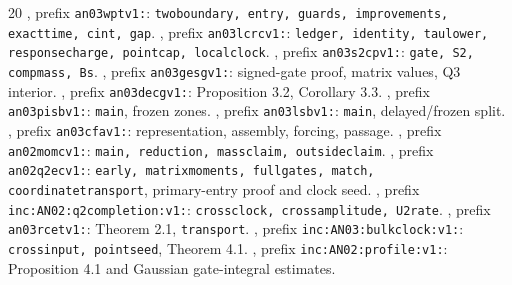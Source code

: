\documentclass[11pt]{article}
\numberwithin{equation}{section}
\theoremstyle{remark}\newtheorem{remark}[theorem]{Remark}
\begin{document}
\begin{thebibliography}{20}\small
{} ,
prefix \texttt{an03wptv1:}: \texttt{twoboundary, entry, guards,
improvements, exacttime, cint, gap}.
 ,
prefix \texttt{an03lcrcv1:}: \texttt{ledger, identity, taulower,
responsecharge, pointcap, localclock}.
 ,
prefix \texttt{an03s2cpv1:}: \texttt{gate, S2, compmass, Bs}.
 ,
prefix \texttt{an03gesgv1:}: signed-gate proof, matrix values,
Q3 interior.
 ,
prefix \texttt{an03decgv1:}: Proposition 3.2, Corollary 3.3.
 ,
prefix \texttt{an03pisbv1:}: \texttt{main}, frozen zones.
 ,
prefix \texttt{an03lsbv1:}: \texttt{main}, delayed/frozen split.
 ,
prefix \texttt{an03cfav1:}: representation, assembly, forcing, passage.
 ,
prefix \texttt{an02momcv1:}: \texttt{main, reduction, massclaim,
outsideclaim}.
 ,
prefix \texttt{an02q2ecv1:}: \texttt{early, matrixmoments, fullgates,
match, coordinatetransport}, primary-entry proof and clock seed.
 ,
prefix \texttt{inc:AN02:q2completion:v1:}: \texttt{crossclock,
crossamplitude, U2rate}.
 ,
prefix \texttt{an03rcetv1:}: Theorem 2.1, \texttt{transport}.
 ,
prefix \texttt{inc:AN03:bulkclock:v1:}: \texttt{crossinput,
pointseed}, Theorem 4.1.
 ,
prefix \texttt{inc:AN02:profile:v1:}: Proposition 4.1 and Gaussian
gate-integral estimates.
\end{thebibliography}
\end{document}
